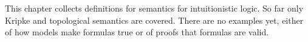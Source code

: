 \documentclass[../../../include/open-logic-chapter]{subfiles}
\begin{document}

\begin{editorial}
  This chapter collects definitions for semantics for intuitionistic
  logic. So far only Kripke and topological semantics are
  covered. There are no examples yet, either of how models make
  formulas true or of proofs that formulas are valid.
\end{editorial}


\OLEndChapterHook
\end{document}
